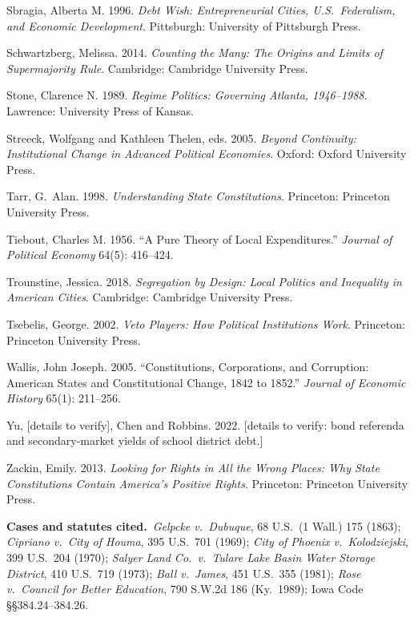 Sbragia, Alberta M. 1996. \emph{Debt Wish: Entrepreneurial Cities, U.S.\ Federalism, and Economic Development}. Pittsburgh: University of Pittsburgh Press.

Schwartzberg, Melissa. 2014. \emph{Counting the Many: The Origins and Limits of Supermajority Rule}. Cambridge: Cambridge University Press.

Stone, Clarence N. 1989. \emph{Regime Politics: Governing Atlanta, 1946--1988}. Lawrence: University Press of Kansas.

Streeck, Wolfgang and Kathleen Thelen, eds. 2005. \emph{Beyond Continuity: Institutional Change in Advanced Political Economies}. Oxford: Oxford University Press.

Tarr, G.\ Alan. 1998. \emph{Understanding State Constitutions}. Princeton: Princeton University Press.

Tiebout, Charles M. 1956. ``A Pure Theory of Local Expenditures.'' \emph{Journal of Political Economy} 64(5): 416--424.

Trounstine, Jessica. 2018. \emph{Segregation by Design: Local Politics and Inequality in American Cities}. Cambridge: Cambridge University Press.

Tsebelis, George. 2002. \emph{Veto Players: How Political Institutions Work}. Princeton: Princeton University Press.

Wallis, John Joseph. 2005. ``Constitutions, Corporations, and Corruption: American States and Constitutional Change, 1842 to 1852.'' \emph{Journal of Economic History} 65(1): 211--256.

Yu, [details to verify], Chen and Robbins. 2022. [details to verify: bond referenda and secondary-market yields of school district debt.]

Zackin, Emily. 2013. \emph{Looking for Rights in All the Wrong Places: Why State Constitutions Contain America's Positive Rights}. Princeton: Princeton University Press.

\medskip
\noindent\textbf{Cases and statutes cited.}\ \emph{Gelpcke v.\ Dubuque}, 68 U.S.\ (1 Wall.) 175 (1863); \emph{Cipriano v.\ City of Houma}, 395 U.S.\ 701 (1969); \emph{City of Phoenix v.\ Kolodziejski}, 399 U.S.\ 204 (1970); \emph{Salyer Land Co.\ v.\ Tulare Lake Basin Water Storage District}, 410 U.S.\ 719 (1973); \emph{Ball v.\ James}, 451 U.S.\ 355 (1981); \emph{Rose v.\ Council for Better Education}, 790 S.W.2d 186 (Ky.\ 1989); Iowa Code \S\S 384.24--384.26.

\endgroup
